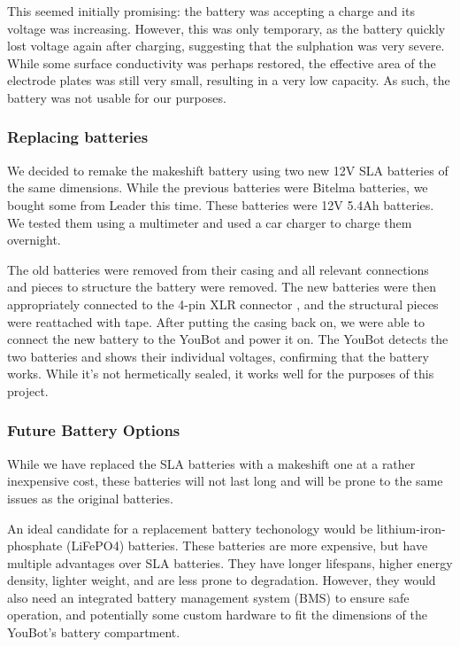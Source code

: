 \documentclass[a4paper, 12pt]{article}
\newif\ifshownotes
\newcommand{\notes}[1]{\ifshownotes\textcolor{blue}{#1}\fi}
\begin{document}
    This seemed initially promising: the battery was accepting a charge and its voltage was increasing. However, this was only temporary, as the battery quickly lost voltage again after charging, suggesting that the sulphation was very severe. While some surface conductivity was perhaps restored, the effective area of the electrode plates was still very small, resulting in a very low capacity. As such, the battery was not usable for our purposes.  

    \subsubsection{Replacing batteries}

    \notes{maybe here we can link to the specific batteries used? the dimensions would be neat as well...}

    We decided to remake the makeshift battery using two new 12V SLA batteries of the same dimensions. While the previous batteries were Bitelma batteries, we bought some from Leader this time. These batteries were 12V 5.4Ah batteries. We tested them using a multimeter and used a car charger to charge them overnight. 
    
    The old batteries were removed from their casing and all relevant connections and pieces to structure the battery were removed. The new batteries were then appropriately connected to the 4-pin XLR connector \notes{maybe mention the pinout here?}, and the structural pieces were reattached with tape. After putting the casing back on, we were able to connect the new battery to the YouBot and power it on. The YouBot detects the two batteries and shows their individual voltages, confirming that the battery works. While it's not hermetically sealed, it works well for the purposes of this project. 

    \subsubsection{Future Battery Options}

    While we have replaced the SLA batteries with a makeshift one at a rather inexpensive cost, these batteries will not last long and will be prone to the same issues as the original batteries. 

    An ideal candidate for a replacement battery techonology would be lithium-iron-phosphate (LiFePO4) batteries. These batteries are more expensive, but have multiple advantages over SLA batteries. They have longer lifespans, higher energy density, lighter weight, and are less prone to degradation. However, they would also need an integrated battery management system (BMS) to ensure safe operation, and potentially some custom hardware to fit the dimensions of the YouBot's battery compartment. 
\end{document}
